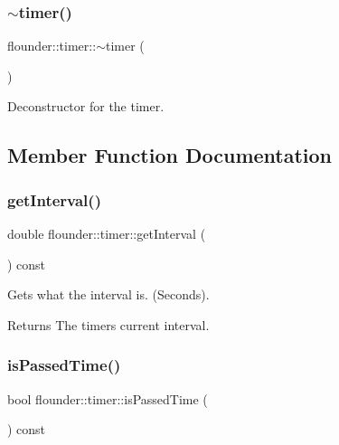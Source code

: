 \subsubsection{\texorpdfstring{$\sim$timer()}{~timer()}}
{\footnotesize\ttfamily flounder\+::timer\+::$\sim$timer (\begin{DoxyParamCaption}{ }\end{DoxyParamCaption})}



Deconstructor for the timer. 



\subsection{Member Function Documentation}
\mbox{\label{classflounder_1_1timer_a9b12cbab2d78c9525873c32d8d0d5e93}} 
\subsubsection{\texorpdfstring{get\+Interval()}{getInterval()}}
{\footnotesize\ttfamily double flounder\+::timer\+::get\+Interval (\begin{DoxyParamCaption}{ }\end{DoxyParamCaption}) const}



Gets what the interval is. (Seconds). 

\begin{DoxyReturn}{Returns}
The timers current interval. 
\end{DoxyReturn}
\mbox{\label{classflounder_1_1timer_a35d709d12d0f7f921d1f00b314d69685}} 
\subsubsection{\texorpdfstring{is\+Passed\+Time()}{isPassedTime()}}
{\footnotesize\ttfamily bool flounder\+::timer\+::is\+Passed\+Time (\begin{DoxyParamCaption}{ }\end{DoxyParamCaption}) const}



